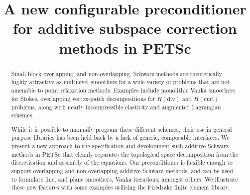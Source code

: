 \documentclass[presentation,aspectratio=43]{beamer}
\title{A new configurable preconditioner for additive subspace correction methods in
  PETSc}
\begin{document}
\begin{abstract}
  Small block overlapping, and non-overlapping, Schwarz methods are
  theoretically highly attractive as multilevel smoothers for a wide
  variety of problems that are not amenable to point relaxation
  methods.  Examples include monolithic Vanka smoothers for Stokes,
  overlapping vertex-patch decompositions for $H(\text{div})$ and
  $H(\text{curl})$ problems, along with nearly incompressible
  elasticity and augmented Lagrangian schemes.

  While it is possible to manually program these different schemes,
  their use in general purpose libraries has been held back by a lack
  of generic, composable interfaces.  We present a new approach to the
  specification and development such additive Schwarz methods in PETSc
  that cleanly separates the topological space decomposition from the
  discretisation and assembly of the equations.  Our preconditioner is
  flexible enough to support overlapping and non-overlapping additive
  Schwarz methods, and can be used to formulate line, and plane
  smoothers, Vanka iterations, amongst others.  We illustrate these
  new features with some examples utilising the Firedrake finite
  element library.
\end{abstract}
\end{document}

